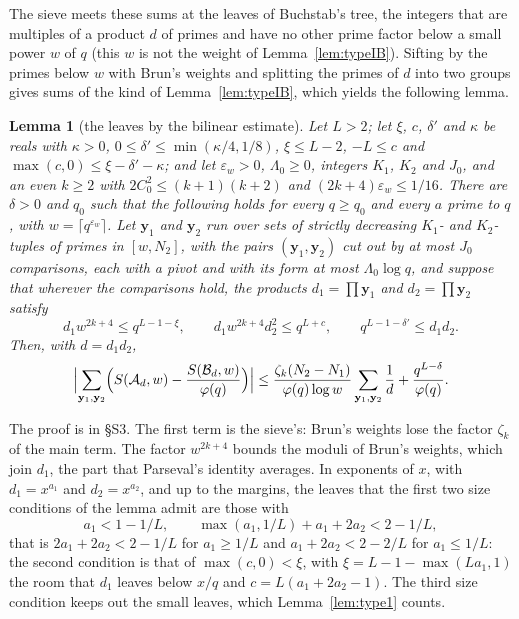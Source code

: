 \documentclass[11pt]{article}
\newtheorem{lemma}[theorem]{Lemma}
\theoremstyle{definition}
\begin{document}
The sieve meets these sums at the leaves of Buchstab's tree, the integers that are multiples of a product $d$ of primes
and have no other prime factor below a small power $w$ of $q$ (this $w$ is not the weight of
Lemma~\ref{lem:typeIB}). Sifting by the primes below $w$ with Brun's weights and
splitting the primes of $d$ into two groups gives sums of the kind of Lemma~\ref{lem:typeIB}, which yields the following
lemma.

\begin{lemma}[the leaves by the bilinear estimate]\label{lem:leaves}
Let $L > 2$; let $\xi$, $c$, $\delta'$ and $\kappa$ be reals with $\kappa > 0$, $0 \le \delta' \le \min(\kappa/4, 1/8)$,
$\xi \le L - 2$, $-L \le c$ and $\max(c, 0) \le \xi - \delta' - \kappa$; and let $\varepsilon_w > 0$, $\Lambda_0 \ge 0$,
integers $K_1$, $K_2$ and $J_0$, and an even $k \ge 2$ with $2C_0^2 \le (k + 1)(k + 2)$ and $(2k + 4)\varepsilon_w \le
1/16$. There are $\delta > 0$ and $q_0$ such that the following holds for every $q \ge q_0$ and every $a$ prime to $q$,
with $w = \lceil q^{\varepsilon_w} \rceil$. Let $\mathbf y_1$ and $\mathbf y_2$ run over sets of strictly decreasing
$K_1$- and $K_2$-tuples of primes in $[w, N_2]$, with the pairs $(\mathbf y_1, \mathbf y_2)$ cut out by at most $J_0$
comparisons, each with a pivot and with its
form at most $\Lambda_0 \log q$, and suppose that wherever the comparisons hold, the products $d_1 = \prod \mathbf y_1$
and $d_2 = \prod \mathbf y_2$ satisfy
\[
  d_1 w^{2k + 4} \le q^{L - 1 - \xi}, \qquad d_1 w^{2k + 4} d_2^2 \le q^{L + c},
  \qquad q^{L - 1 - \delta'} \le d_1 d_2.
\]
Then, with $d = d_1 d_2$,
\[
  \Bigl|\sum_{\mathbf y_1, \mathbf y_2} \Bigl(S(\mathcal A_d, w) - \frac{S(\mathcal B_d, w)}{\varphi(q)}\Bigr)\Bigr|
  \le \frac{\zeta_k (N_2 - N_1)}{\varphi(q) \log w} \sum_{\mathbf y_1, \mathbf y_2} \frac1d + \frac{q^{L -
  \delta}}{\varphi(q)}.
\]
\end{lemma}

The proof is in \S S3. The first term is the sieve's: Brun's weights lose the factor $\zeta_k$ of the main term. The
factor $w^{2k + 4}$ bounds the moduli of Brun's weights, which join $d_1$, the part that Parseval's identity averages.
In exponents of $x$, with $d_1 = x^{a_1}$ and $d_2 = x^{a_2}$, and up to the margins, the leaves that the first two
size conditions of the lemma admit are those with
\[
  a_1 < 1 - 1/L, \qquad \max(a_1, 1/L) + a_1 + 2a_2 < 2 - 1/L,
\]
that is $2a_1 + 2a_2 < 2 - 1/L$ for $a_1 \ge 1/L$ and $a_1 + 2a_2 < 2 - 2/L$ for $a_1 \le 1/L$: the second condition
is that of $\max(c, 0) < \xi$, with $\xi = L - 1 - \max(L a_1, 1)$ the room that $d_1$ leaves below $x/q$ and
$c = L(a_1 + 2a_2 - 1)$. The third size condition keeps out the small leaves, which Lemma~\ref{lem:type1} counts.
\end{document}
